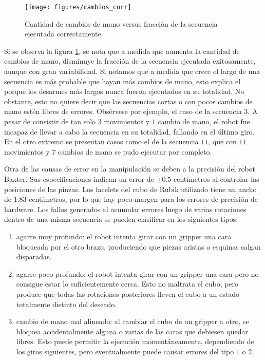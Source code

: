\begin{figure}[h!]
	\centering
	\texttt{[image: figures/cambios\_corr]}
	\caption{Cantidad de cambios de mano versus fracción de la secuencia ejecutada correctamente.}
	\label{corr}
\end{figure}
Si se observa la figura \ref{corr}, se nota que a medida que aumenta la cantidad de cambios de mano, disminuye la fracción de la secuencia ejecutada exitosamente, aunque con gran variabilidad. Si notamos que a medida que crece el largo de una secuencia es más probable que hayan más cambios de mano, esto explica el porque los desarmes más largos nunca fueron ejecutados en su totalidad. No obstante, esto no quiere decir que las secuencias cortas o con pocos cambios de mano estén libres de errores. Obsérvese por ejemplo, el caso de la secuencia $3$. A pesar de consistir de tan solo $3$ movimientos y $1$ cambio de mano, el robot fue incapaz de llevar a cabo la secuencia en su totalidad, fallando en el último giro. En el otro extremo se presentan casos como el de la secuencia $11$, que con $11$ movimientos y $7$ cambios de mano se pudo ejecutar por completo.

Otra de las causas de error en la manipulación se deben a la precisión del robot Baxter. Sus especificaciones indican un error de $\pm 0.5$ centímetros al controlar las posiciones de las pinzas. Los facelets del cubo de Rubik utilizado tiene un ancho de 1.83 centímetros, por lo que hay poco margen para los errores de precisión de hardware. Los fallos generados al acumular errores luego de varias rotaciones dentro de una misma secuencia se pueden clasificar en los siguientes tipos:
\begin{enumerate}
	\item agarre muy profundo: el robot intenta girar con un gripper una cara bloqueada por el otro brazo, produciendo que piezas aristas o esquinas salgan disparadas.
	\item agarre poco profundo: el robot intenta girar con un gripper una cara pero no consigue estar lo suficientemente cerca. Esto no maltrata el cubo, pero produce que todas las rotaciones posteriores lleven el cubo a un estado totalmente distinto del deseado.
	\item cambio de mano mal alineado: al cambiar el cubo de un gripper a otro, se bloquea accidentalmente alguna o varias de las caras que debiesen quedar libres. Esto puede permitir la ejecución momentáneamente, dependiendo de los giros siguientes, pero eventualmente puede causar errores del tipo $1$ o $2$.
\end{enumerate}

